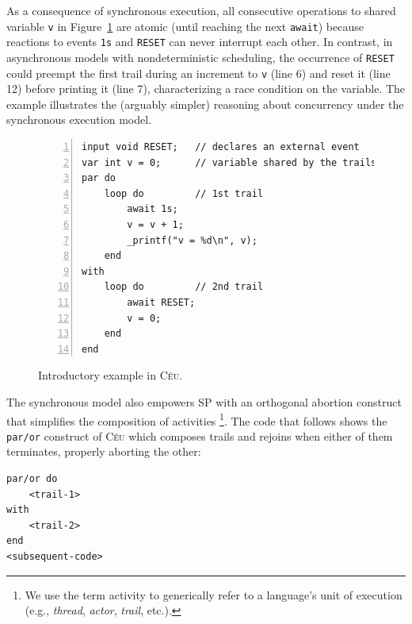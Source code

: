 \documentclass{sigplanconf}
\newcommand{\CEU}{\textsc{C\'{e}u}\xspace}
\newcommand{\code}[1] {{\small{\texttt{#1}}}}
\newcommand{\1}{\;}
\newcommand{\2}{\;\;}
\newcommand{\3}{\;\;\;}
\newcommand{\5}{\;\;\;\;\;}
\begin{document}

As a consequence of synchronous execution, all consecutive operations to shared 
variable \code{v} in Figure~\ref{lst.intro} are atomic (until reaching the next 
\code{await}) because reactions to events \code{1s} and \code{RESET} can never 
interrupt each other.
%
In contrast, in asynchronous models with nondeterministic scheduling, the 
occurrence of \code{RESET} could preempt the first trail during an increment to 
\code{v} (line 6) and reset it (line 12) before printing it (line 7), 
characterizing a race condition on the variable.
%
The example illustrates the (arguably simpler) reasoning about concurrency 
under the synchronous execution model.

\begin{figure}%
\begin{lstlisting}[numbers=left,xleftmargin=3em]
input void RESET;   // declares an external event
var int v = 0;      // variable shared by the trails
par do
    loop do         // 1st trail
        await 1s;
        v = v + 1;
        _printf("v = %d\n", v);
    end
with
    loop do         // 2nd trail
        await RESET;
        v = 0;
    end
end
\end{lstlisting}
\caption{ Introductory example in \CEU.
\label{lst.intro}
}
\end{figure}


The synchronous model also empowers SP with an orthogonal abortion construct 
that simplifies the composition of activities%
\footnote{We use the term activity to generically refer to a language's unit of 
execution (e.g., \emph{thread}, \emph{actor}, \emph{trail}, etc.).}.
%
%
The code that follows shows the \code{par/or} construct of \CEU which composes 
trails and rejoins when either of them terminates, properly aborting the other:

\begin{lstlisting}
par/or do
    <trail-1>
with
    <trail-2>
end
<subsequent-code>
\end{lstlisting}

\end{document}
